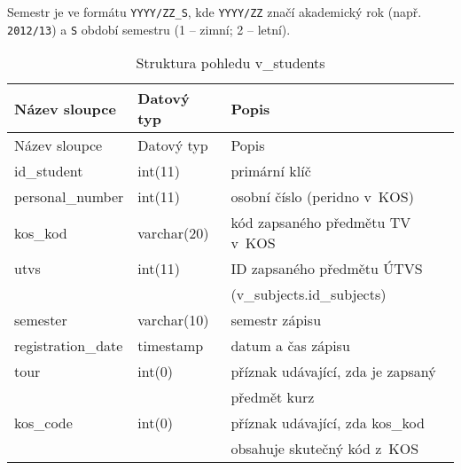 Semestr je ve formátu \verb!YYYY/ZZ_S!, kde \verb!YYYY/ZZ! značí akademický rok (např. \verb!2012/13!) a \verb!S! období semestru (1 -- zimní; 2 -- letní).

\begin{longtable}[]{@{}lll@{}}
\caption{Struktura pohledu v\_students \label{tab:students}}\tabularnewline
\toprule
Název sloupce & Datový typ & Popis\tabularnewline
\midrule
\endfirsthead
\toprule
Název sloupce & Datový typ & Popis\tabularnewline
\midrule
\endhead
id\_student & int(11) & primární klíč\tabularnewline
personal\_number & int(11) & osobní číslo (peridno v~KOS)\tabularnewline
kos\_kod & varchar(20) & kód zapsaného předmětu TV v~KOS\tabularnewline
utvs & int(11) & ID zapsaného předmětu ÚTVS\tabularnewline
\begin{minipage}[t]{0.32\columnwidth}\raggedright\strut
\strut
\end{minipage} & \begin{minipage}[t]{0.32\columnwidth}\raggedright\strut
\strut
\end{minipage} & \begin{minipage}[t]{0.32\columnwidth}\raggedright\strut
(v\_subjects.id\_subjects)\strut
\end{minipage}\tabularnewline
semester & varchar(10) & semestr zápisu\tabularnewline
registration\_date & timestamp & datum a čas zápisu\tabularnewline
tour & int(0) & příznak udávající, zda je zapsaný\tabularnewline
\begin{minipage}[t]{0.32\columnwidth}\raggedright\strut
\strut
\end{minipage} & \begin{minipage}[t]{0.32\columnwidth}\raggedright\strut
\strut
\end{minipage} & \begin{minipage}[t]{0.32\columnwidth}\raggedright\strut
předmět kurz\strut
\end{minipage}\tabularnewline
kos\_code & int(0) & příznak udávající, zda kos\_kod\tabularnewline
\begin{minipage}[t]{0.32\columnwidth}\raggedright\strut
\strut
\end{minipage} & \begin{minipage}[t]{0.32\columnwidth}\raggedright\strut
\strut
\end{minipage} & \begin{minipage}[t]{0.32\columnwidth}\raggedright\strut
obsahuje skutečný kód z~KOS\strut
\end{minipage}\tabularnewline
\bottomrule
\end{longtable}

